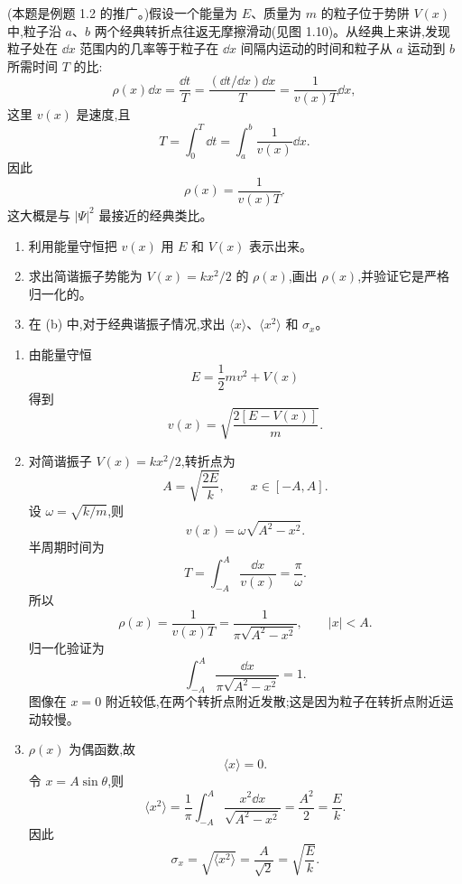 \begin{question}
(本题是例题 1.2 的推广。)假设一个能量为 $E$、质量为 $m$ 的粒子位于势阱 $V(x)$ 中,粒子沿 $a$、$b$ 两个经典转折点往返无摩擦滑动(见图 1.10)。从经典上来讲,发现粒子处在 $\dd x$ 范围内的几率等于粒子在 $\dd x$ 间隔内运动的时间和粒子从 $a$ 运动到 $b$ 所需时间 $T$ 的比:
\[
\rho(x)\dd x=\frac{\dd t}{T}=\frac{(\dd t/\dd x)\dd x}{T}=\frac{1}{v(x)T}\dd x,
\tag{1.41}
\]
这里 $v(x)$ 是速度,且
\[
T=\int_0^T \dd t=\int_a^b \frac{1}{v(x)}\dd x.
\tag{1.42}
\]
因此
\[
\rho(x)=\frac{1}{v(x)T}.
\tag{1.43}
\]
这大概是与 $|\Psi|^2$ 最接近的经典类比。
\begin{enumerate}
\item 利用能量守恒把 $v(x)$ 用 $E$ 和 $V(x)$ 表示出来。
\item 求出简谐振子势能为 $V(x)=kx^2/2$ 的 $\rho(x)$,画出 $\rho(x)$,并验证它是严格归一化的。
\item 在 (b) 中,对于经典谐振子情况,求出 $\langle x\rangle$、$\langle x^2\rangle$ 和 $\sigma_x$。
\end{enumerate}
\begin{solution}
\begin{enumerate}
\item 由能量守恒
\[
E=\frac12mv^2+V(x)
\]
得到
\[
v(x)=\sqrt{\frac{2[E-V(x)]}{m}}.
\]
\item 对简谐振子 $V(x)=kx^2/2$,转折点为
\[
A=\sqrt{\frac{2E}{k}},\qquad x\in[-A,A].
\]
设 $\omega=\sqrt{k/m}$,则
\[
v(x)=\omega\sqrt{A^2-x^2}.
\]
半周期时间为
\[
T=\int_{-A}^{A}\frac{\dd x}{v(x)}=\frac{\pi}{\omega}.
\]
所以
\[
\rho(x)=\frac{1}{v(x)T}=\frac{1}{\pi\sqrt{A^2-x^2}},\qquad |x|<A.
\]
归一化验证为
\[
\int_{-A}^{A}\frac{\dd x}{\pi\sqrt{A^2-x^2}}=1.
\]
图像在 $x=0$ 附近较低,在两个转折点附近发散;这是因为粒子在转折点附近运动较慢。
\item $\rho(x)$ 为偶函数,故
\[
\langle x\rangle=0.
\]
令 $x=A\sin\theta$,则
\[
\langle x^2\rangle=\frac{1}{\pi}\int_{-A}^{A}\frac{x^2\dd x}{\sqrt{A^2-x^2}}
=\frac{A^2}{2}=\frac{E}{k}.
\]
因此
\[
\sigma_x=\sqrt{\langle x^2\rangle}=\frac{A}{\sqrt2}=\sqrt{\frac{E}{k}}.
\]
\end{enumerate}
\end{solution}
\end{question}

